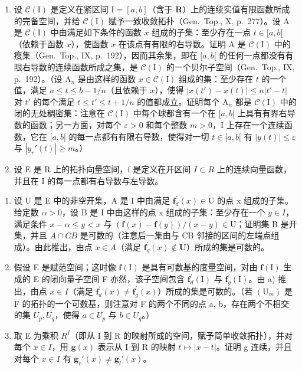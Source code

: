 \begin{enumerate}
\def\labelenumi{\arabic{enumi})}
\setcounter{enumi}{2}
\item
  设 \(\mathcal{C}(\mathrm{I})\) 是定义在紧区间 \(\mathrm{I} = [a,b]\)（含于 \(\mathbf{R}\)）上的连续实值有限函数所成的完备空间，并给 \(\mathcal{C}(\mathrm{I})\) 赋予一致收敛拓扑（Gen.~Top., X, p.~277）。设 A 是 \(\mathcal{C}(\mathrm{I})\) 中由满足如下条件的函数 \(x\) 组成的子集：至少存在一点 \(t\in [a,b[\)（依赖于函数 \(x\)），使函数 \(x\) 在该点有有限的右导数。证明 A 是 \(\mathcal{C}(\mathrm{I})\) 中的瘦集（Gen.~Top., IX, p.~192），因而其余集，即在 \([a,b[\) 的任何一点都没有有限右导数的连续函数所成之集，是 \(\mathcal{C}(\mathrm{I})\) 的一个贝尔子空间（Gen.~Top., IX, p.~192）。（设 \(\mathrm{A}_n\) 是由这样的函数 \(x\in \mathcal{C}(\mathrm{I})\) 组成的集：至少存在 \(t\) 的一个值，满足 \(a\leqslant t\leqslant b - 1 / n\)（且依赖于 \(x\)），使得 \(|x(t') - x(t)|\leqslant n|t' - t|\) 对 \(t'\) 的每个满足 \(t\leqslant t'\leqslant t + 1 / n\) 的值都成立。证明每个 \(\mathrm{A}_n\) 都是 \(\mathcal{C}(\mathrm{I})\) 中的闭的无处稠密集：注意在 \(\mathcal{C}(\mathrm{I})\) 中每个球都含有一个在 \([a,b[\) 上具有有界右导数的函数；另一方面，对每个 \(\varepsilon >0\) 和每个整数 \(m > 0\)，I 上存在一个连续函数，它在 \([a,b[\) 的每一点都有有限右导数，使得对一切 \(t\in [a,b[\) 有 \(|y(t)|\leqslant \varepsilon\) 与 \(|y_r'(t)|\geqslant m\)。）
\item
  设 E 是 R 上的拓扑向量空间，f 是定义在开区间 \(I \subset R\) 上的连续向量函数，并且在 I 的每一点都有右导数与左导数。
\end{enumerate}

\begin{enumerate}
\def\labelenumi{\alph{enumi})}
\item
  设 U 是 E 中的非空开集，A 是 I 中由满足 \(\mathbf{f}_{d}^{\prime}(x) \in \mathrm{U}\) 的点 x 组成的子集。给定数 \(\alpha > 0\)，设 B 是 I 中由这样的点 x 组成的子集：至少存在一个 \(y \in I\)，满足条件 \(x - \alpha \leqslant y < x\) 与 \((\mathbf{f}(x) - \mathbf{f}(y)) / (x - y) \in \mathrm{U}\)；证明集 B 是开集，并且 \(A \cap CB\) 是可数的（注意后一集由与 CB 邻接的区间的左端点组成）。由此推出，由点 \(x \in A\)（满足 \(\mathbf{f}_{g}^{\prime}(x) \notin \overline{\mathbf{U}}\)）所成的集是可数的。
\item
  假设 E 是赋范空间；这时像 \(\mathbf{f}(\mathrm{I})\) 是具有可数基的度量空间，对由 \(\mathbf{f}(\mathrm{I})\) 生成的 E 的闭向量子空间 F 亦然，该子空间包含 \(\mathbf{f}_{d}^{\prime}(\mathrm{I})\) 与 \(\mathbf{f}_{g}^{\prime}(\mathrm{I})\)。由 a) 推出，由点 \(x \in I\)（满足 \(\mathbf{f}_{d}^{\prime}(x) \neq \mathbf{f}_{g}^{\prime}(x)\)）所成的集是可数的。（若 \((\mathrm{U}_{m})\) 是 F 的拓扑的一个可数基，则注意对 F 的两个不同的点 a, b，存在两个不相交的集 \(U_{p}, U_{q}\)，使得 \(a \in U_{p}\) 与 \(b \in U_{q}\)。）
\item
  取 E 为乘积 \(R^{I}\)（即从 I 到 R 的映射所成的空间，赋予简单收敛拓扑），并对每个 \(x \in I\)，用 \(\mathbf{g}(x)\) 表示从 I 到 R 的映射 \(t \mapsto |x - t|\)。证明 g 连续，并且对每个 \(x \in I\) 有 \(\mathbf{g}_{r}'(x) \neq \mathbf{g}_{l}'(x)\)。
\end{enumerate}

